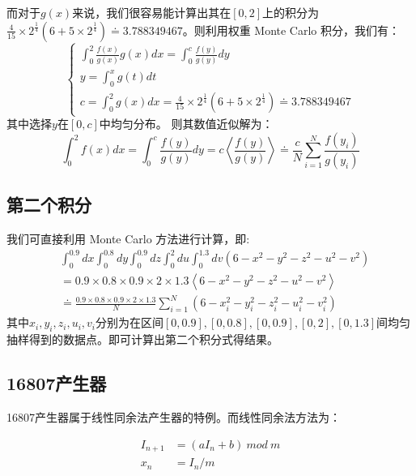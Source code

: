\documentclass[a4paper,11pt]{article}
\begin{document}
\newpage
而对于$g(x)$来说，我们很容易能计算出其在$[0,2]$上的积分为$\frac{4}{15} \times 2^{\frac{1}{4}} (6 + 5\times 2^{\frac{1}{4}}) \doteq 3.788349467$。则利用权重 Monte Carlo 积分，我们有：
\begin{equation}
\left\{
\begin{array}{l}
	\int^{2}_{0}\frac{f(x)}{g(x)}g(x)dx = \int_{0}^{c}\frac{f(y)}{g(y)}dy \\
	y = \int_{0}^{x} g(t)dt \\
	c = \int_{0}^{2} g(x)dx = \frac{4}{15} \times 2^{\frac{1}{4}} (6 + 5\times 2^{\frac{1}{4}}) \doteq 3.788349467

\end{array}
\right.
\end{equation}
其中选择$y$在$[0,c]$中均匀分布。
则其数值近似解为：
\begin{equation}
	\int^{2}_{0}f(x)dx = \int_{0}^{c}\frac{f(y)}{g(y)}dy = c\left <\frac{f(y)}{g(y)} \right> \doteq \frac{c}{N}\sum _{i=1}^{N}\frac{f(y_{i})}{g(y_{i})}
\end{equation}


\subsection{第二个积分}
我们可直接利用 Monte Carlo 方法进行计算，即:
\begin{equation}
\begin{aligned}
	&\int^{0.9}_{0}dx\int^{0.8}_{0}dy\int^{0.9}_{0}dz\int^{2}_{0}du\int^{1.3}_{0}dv (6-x^{2}-y^{2}-z^{2}-u^{2}-v^{2}) \\
	&= 0.9\times 0.8\times 0.9\times 2\times 1.3 \left<  6-x^{2}-y^{2}-z^{2}-u^{2}-v^{2}   \right> \\
	&\doteq \frac{0.9\times 0.8\times 0.9\times 2\times 1.3}{N}\sum _{i=1}^{N} (6-x^{2}_{i}-y^{2}_{i}-z^{2}_{i}-u^{2}_{i}-v^{2}_{i})
\end{aligned}
\end{equation}
其中$x_{i},y_{i},z_{i},u_{i},v_{i}$分别为在区间$[0,0.9],[0,0.8],[0,0.9],[0,2],[0,1.3]$间均匀抽样得到的数据点。即可计算出第二个积分式得结果。


\subsection{16807产生器}
16807产生器属于线性同余法产生器的特例。而线性同余法方法为：

\begin{equation}
\begin{aligned}
	I_{n+1} &= (aI_{n} + b) \ mod \ m \\
	x_{n} &= I_{n}/m
\end{aligned}
\label{linear}	
\end{equation}
\end{document}

